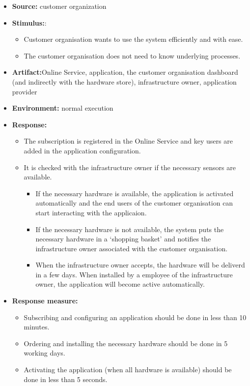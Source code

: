 \documentclass[english]{sareport}
\begin{document}
\begin{itemize}
    \item \textbf{Source:} customer organization
    \item \textbf{Stimulus:}: 
    \begin{itemize}
    \item Customer organisation wants to use the system efficiently and with ease.
    \item The customer organisation does not need to know underlying processes.
    \end{itemize}
    \item \textbf{Artifact:}Online Service, application, the customer organisation dashboard (and indirectly with the hardware store), infrastructure owner, application provider
    \item \textbf{Environment:} normal execution
    \item \textbf{Response:}
        \begin{itemize}
            \item The subscription is registered in the Online Service and key users are added in the application configuration.
            \item It is checked with the infrastructure owner if the necessary sensors are available.
            \begin{itemize} 
            \item If the necessary hardware is available, the application is activated automatically and the end users of the customer organisation can start interacting with the applicaion.
            \item If the necessary hardware is not available, the system puts the necessary hardware in a `shopping basket' and notifies the infrastructure owner associated with the customer organisation.
            \item When the infrastructure owner accepts, the hardware will be deliverd in a few days. When installed by a employee of the infrastructure owner, the application will become active automatically.
            \end{itemize}
        \end{itemize}

    \item \textbf{Response measure:}
        \begin{itemize}
            \item Subscribing and configuring an application should be done in less than 10 minutes.
            \item Ordering and installing the necessary hardware should be done in 5 working days.
            \item Activating the application (when all hardware is available) should be done in less than 5 seconds.
        \end{itemize}
\end{itemize}
\end{document}
